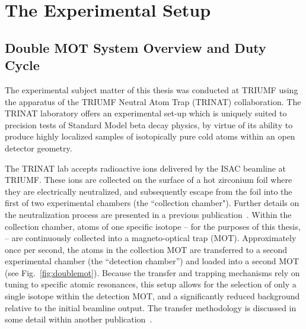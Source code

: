 

\clearpage
\chapter{The Experimental Setup}
\label{setup_chapter}

\section{Double MOT System Overview and Duty Cycle}

The experimental subject matter of this thesis was conducted at TRIUMF using the apparatus of the TRIUMF Neutral Atom Trap (TRINAT) collaboration.  The TRINAT laboratory offers an experimental set-up which is uniquely suited to precision tests of Standard Model beta decay physics, by virtue of its ability to produce highly localized samples of isotopically pure cold atoms within an open detector geometry.  

The TRINAT lab accepts radioactive ions delivered by the ISAC beamline at TRIUMF.  These ions are collected on the surface of a hot zirconium foil where they are electrically neutralized, and subsequently escape from the foil into the first of two experimental chambers (the ``collection chamber").  Further details on the neutralization process are presented in a previous publication~\cite{gorelov2000}.  Within the collection chamber, atoms of one specific isotope -- for the purposes of this thesis,   -- are continuously collected into a magneto-optical trap (MOT).  Approximately once per second, the atoms in the collection MOT are transferred to a second experimental chamber (the ``detection chamber'') and loaded into a second MOT (see Fig.~\ref{fig:doublemot}).  Because the transfer and trapping mechanisms rely on tuning to specific atomic resonances, this setup allows for the selection of only a single isotope within the detection MOT, and a significantly reduced background relative to the initial beamline output.  The transfer methodology is discussed in some detail within another publication~\cite{swanson}.



